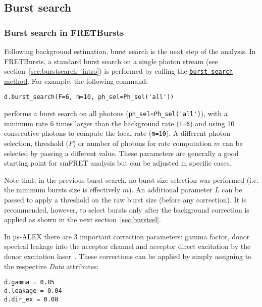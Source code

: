 \subsection{Burst search}
\label{sec:burstsearch}

\subsubsection{Burst search in FRETBursts}
\label{sec:burstsearch_code}

Following background estimation, burst search is the next step of
the analysis.
In FRETBursts, a standard burst search on a single photon stream
(see section~\ref{sec:burstsearch_intro}) is performed by calling the
\href{http://fretbursts.readthedocs.org/en/latest/data\_class.html#fretbursts.burstlib.Data.burst\_search}{\texttt{burst\_search} method}.
For example, the following command:

\begin{verbatim}
d.burst_search(F=6, m=10, ph_sel=Ph_sel('all'))
\end{verbatim}

performs a burst search on all photons
(\verb|ph_sel=Ph_sel('all')|), with a minimum rate 6 times larger than the
background rate (\verb|F=6|) and using 10 consecutive photons to compute the
local rate (\verb|m=10|).
A different photon selection, threshold ($F$) or number of photons for rate
computation $m$ can be selected by passing a different value. These parameters
are generally a good starting point for smFRET analysis but can be adjusted in
specific cases.

Note that, in the previous burst search, no burst size selection was performed
(i.e. the minimum bursts size is effectively $m$).
An additional parameter $L$ can be passed to apply a threshold on the raw burst
size (before any correction).
It is recommended, however, to select bursts only after the background correction
is applied as shown in the next section~\ref{sec:burstsel}.

In µs-ALEX there are 3 important correction parameters: gamma factor, donor spectral
leakage into the acceptor channel and acceptor direct excitation by the donor excitation
laser~\cite{Lee_2005}.
These corrections can be applied by simply assigning to the respective \textit{Data} attributes:

\begin{verbatim}
d.gamma = 0.85
d.leakage = 0.04
d.dir_ex = 0.08
\end{verbatim}

